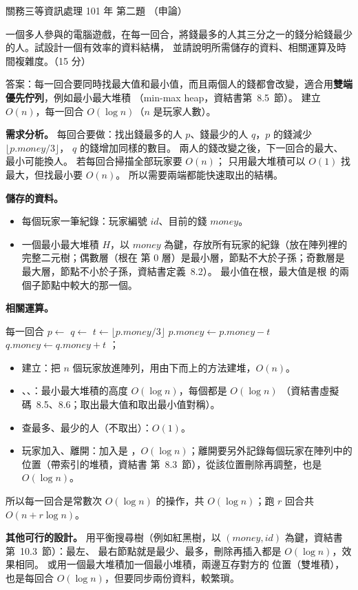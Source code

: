 \begin{pastexam}[label={px:gw3-101-ds-02}]{關務三等資訊處理 101 年 第二題}
（申論）

一個多人參與的電腦遊戲，在每一回合，將錢最多的人其三分之一的錢分給錢最少的人。試設計一個有效率的資料結構，
並請說明所需儲存的資料、相關運算及時間複雜度。（15 分）
\end{pastexam}

\begin{pastsoln}
答案：每一回合要同時找最大值和最小值，而且兩個人的錢都會改變，適合用\textbf{雙端優先佇列}，例如最小最大堆積
（min-max heap，資結書第~8.5~節）。 建立 $O(n)$，每一回合 $O(\log n)$（$n$ 是玩家人數）。

\textbf{需求分析。} 每回合要做：找出錢最多的人 $p$、錢最少的人 $q$，$p$ 的錢減少 $\lfloor p.\mathit{money}/3 \rfloor$，
$q$ 的錢增加同樣的數目。 兩人的錢改變之後，下一回合的最大、最小可能換人。 若每回合掃描全部玩家要 $O(n)$；
只用最大堆積可以 $O(1)$ 找最大，但找最小要 $O(n)$。 所以需要兩端都能快速取出的結構。

\textbf{儲存的資料。}
\begin{itemize}
\item 每個玩家一筆紀錄：玩家編號 $\mathit{id}$、目前的錢 $\mathit{money}$。
\item 一個最小最大堆積 $H$，以 $\mathit{money}$ 為鍵，存放所有玩家的紀錄（放在陣列裡的完整二元樹；偶數層（根在
第 $0$ 層）是最小層，節點不大於子孫；奇數層是最大層，節點不小於子孫，資結書定義~8.2）。 最小值在根，最大值是根
的兩個子節點中較大的那一個。
\end{itemize}

\textbf{相關運算。}
\begin{pseudo}{每一回合}
        \State \Return
    \EndIf
    \State $p \gets$  
    \State $q \gets$  
    \State $t \gets \lfloor p.\mathit{money} / 3 \rfloor$
    \State $p.\mathit{money} \gets p.\mathit{money} - t$
    \State $q.\mathit{money} \gets q.\mathit{money} + t$
    \State {}；
\EndProcedure
\end{pseudo}
\begin{itemize}
\item 建立：把 $n$ 個玩家放進陣列，用由下而上的方法建堆，$O(n)$。
\item {}、、：最小最大堆積的高度 $O(\log n)$，每個都是 $O(\log n)$
（資結書虛擬碼~8.5、8.6；取出最大值和取出最小值對稱）。
\item 查最多、最少的人（不取出）：$O(1)$。
\item 玩家加入、離開：加入是 ，$O(\log n)$；離開要另外記錄每個玩家在陣列中的位置（帶索引的堆積，資結書
第~8.3~節），從該位置刪除再調整，也是 $O(\log n)$。
\end{itemize}
所以每一回合是常數次 $O(\log n)$ 的操作，共 $O(\log n)$；跑 $r$ 回合共 $O(n + r \log n)$。

\textbf{其他可行的設計。} 用平衡搜尋樹（例如紅黑樹，以 $(\mathit{money}, \mathit{id})$ 為鍵，資結書第~10.3~節）：最左、
最右節點就是最少、最多，刪除再插入都是 $O(\log n)$，效果相同。 或用一個最大堆積加一個最小堆積，兩邊互存對方的
位置（雙堆積），也是每回合 $O(\log n)$，但要同步兩份資料，較繁瑣。
\end{pastsoln}
